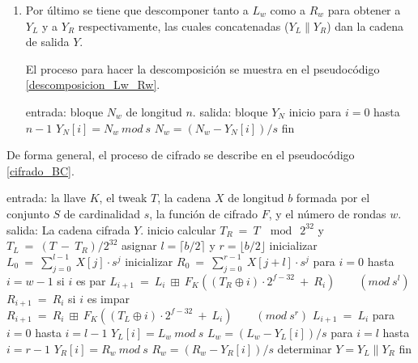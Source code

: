 \begin{enumerate}
  \item Por último se tiene que descomponer tanto a $L_w$ como a $R_w$ para
    obtener a $Y_L$ y a $Y_R$ respectivamente, las cuales concatenadas
    ($Y_L \parallel Y_R$) dan la cadena de salida $Y$.

    El proceso para hacer la descomposición se muestra en el pseudocódigo
    \ref{descomposicion_Lw_Rw}.

\begin{pseudocodigo}[caption={Proceso de descomposición de $L_w$ o $R_w$.},
    label={descomposicion_Lw_Rw}]
   entrada:   bloque $N_w$ de longitud $n$.
   salida:    bloque $Y_N$
   inicio
     para $i=0$ hasta $n-1$
       $Y_N[i] = N_w\ mod\ s$
       $N_w = (N_w - Y_N[i])/s$
   fin
\end{pseudocodigo}

\end{enumerate}

De forma general, el proceso de cifrado se describe en el pseudocódigo
\ref{cifrado_BC}.

\begin{pseudocodigo}[caption={Proceso de cifrado $BC$.},
label={cifrado_BC}]
    entrada:    la llave $K$,
                el tweak $T$,
                la cadena $X$ de longitud $b$ formada por el conjunto $S$
                  de cardinalidad $s$,
                la función de cifrado $F$, y el número de rondas $w$.
    salida:     La cadena cifrada $Y$.
    inicio
      calcular $T_R\: =\: T\: \mod\: 2^{32}$ y $T_L\: =\: (T\: -\: T_R) / 2^{32}$
      asignar $l = \lceil b/2 \rceil$ y $r = \lfloor b/2 \rfloor$
      inicializar $L_0\: =\: \sum_{j=0}^{l-1}\: X[j] \cdot s^j$
      inicializar $R_0\: =\: \sum_{j=0}^{r-1}\: X[j+l] \cdot s^j$
      para $i=0$ hasta $i=w-1$
        si $i$ es par
          $L_{i+1}\: =\: L_i\: \boxplus\: F_K((T_R \oplus i) \cdot 2^{f-32}\: +\: R_i)\qquad (mod\ s^l)$
          $R_{i+1}\: =\: R_i$
        si $i$ es impar
          $R_{i+1}\: =\: R_i\: \boxplus\: F_K((T_L \oplus i) \cdot 2^{f-32}\: +\: L_i)\qquad (mod\ s^r)$
          $L_{i+1}\: =\: L_i$
      para $i=0$ hasta $i=l-1$
        $Y_L[i] = L_w\ mod\ s$
        $L_w = (L_w - Y_L[i])/s$
      para $i=l$ hasta $i=r-1$
        $Y_R[i] = R_w\ mod\ s$
        $R_w = (R_w - Y_R[i])/s$
      determinar $Y = Y_L \parallel Y_R$
    fin
\end{pseudocodigo}


